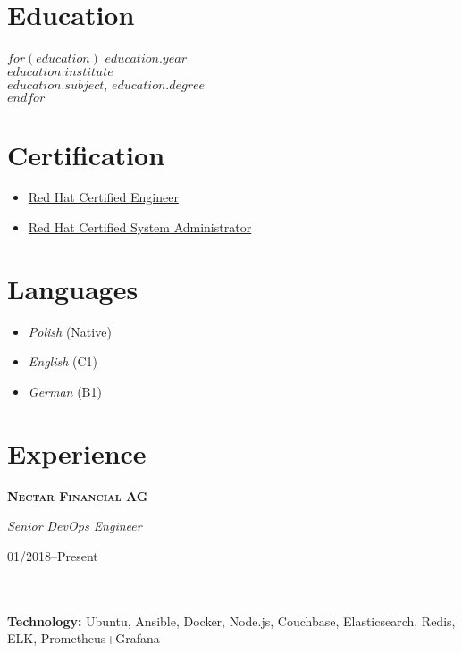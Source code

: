 \documentclass[$fontsize$, a4paper]{article}
\newcommand\textbox[1]{%
  \parbox{.333\textwidth}{#1}%
}
\begin{document}
\begin{multicols}{2}

\section*{Education}
$for(education)$
$education.year$\\
\emph{$education.institute$}\\
\textbf{$education.subject$}, $education.degree$\\

$endfor$

\columnbreak

\section*{Certification}

\begin{itemize}
  \setlength\itemsep{-0.5em}
  \item \href{https://www.redhat.com/rhtapps/certification/verify/?certId=140-054-446}{Red Hat Certified Engineer}
  \item \href{https://www.redhat.com/rhtapps/certification/verify/?certId=140-054-446}{Red Hat Certified System Administrator}
\end{itemize}

\section*{Languages}
\begin{itemize}
  \setlength\itemsep{-0.5em}
  \item \emph{Polish} (Native)
  \item \emph{English} (C1)
  \item \emph{German} (B1)
\end{itemize}

\end{multicols}

\vspace{-10pt}


\section*{Experience}
\noindent

\noindent\textbox{\textbf{\textsc{Nectar Financial AG}}\hfill}\textbox{\hfil \emph{Senior DevOps Engineer}\hfil}\textbox{\hfill 01/2018--Present}\\\\
\textbf{Technology:} Ubuntu, Ansible, Docker, Node.js, Couchbase, Elasticsearch, Redis, ELK, Prometheus+Grafana
\end{document}
